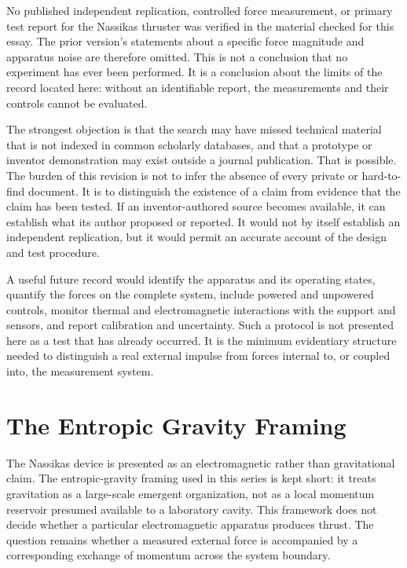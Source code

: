 \documentclass[11pt]{article}
\begin{document}
No published independent replication, controlled force measurement, or primary test report for the Nassikas thruster was verified in the material checked for this essay. The prior version's statements about a specific force magnitude and apparatus noise are therefore omitted. This is not a conclusion that no experiment has ever been performed. It is a conclusion about the limits of the record located here: without an identifiable report, the measurements and their controls cannot be evaluated.

The strongest objection is that the search may have missed technical material that is not indexed in common scholarly databases, and that a prototype or inventor demonstration may exist outside a journal publication. That is possible. The burden of this revision is not to infer the absence of every private or hard-to-find document. It is to distinguish the existence of a claim from evidence that the claim has been tested. If an inventor-authored source becomes available, it can establish what its author proposed or reported. It would not by itself establish an independent replication, but it would permit an accurate account of the design and test procedure.

A useful future record would identify the apparatus and its operating states, quantify the forces on the complete system, include powered and unpowered controls, monitor thermal and electromagnetic interactions with the support and sensors, and report calibration and uncertainty. Such a protocol is not presented here as a test that has already occurred. It is the minimum evidentiary structure needed to distinguish a real external impulse from forces internal to, or coupled into, the measurement system.

\section{The Entropic Gravity Framing}

The Nassikas device is presented as an electromagnetic rather than gravitational claim. The entropic-gravity framing used in this series is kept short: it treats gravitation as a large-scale emergent organization, not as a local momentum reservoir presumed available to a laboratory cavity. This framework does not decide whether a particular electromagnetic apparatus produces thrust. The question remains whether a measured external force is accompanied by a corresponding exchange of momentum across the system boundary.
\end{document}
